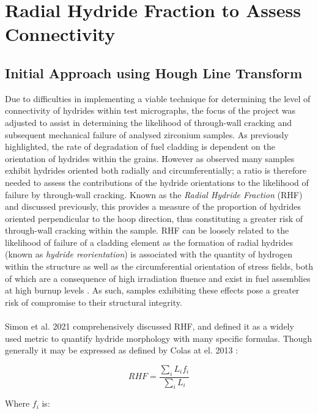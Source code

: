 \documentclass{article}
\begin{document}
\section{Radial Hydride Fraction to Assess Connectivity}
\subsection{Initial Approach using Hough Line Transform}

    Due to difficulties in implementing a viable technique for determining the level of connectivity of hydrides within test micrographs, the focus of the project was adjusted to assist in determining the likelihood of through-wall cracking and subsequent mechanical failure of analysed zirconium samples. As previously highlighted, the rate of degradation of fuel cladding is dependent on the orientation of hydrides within the grains. However as observed many samples exhibit hydrides oriented both radially and circumferentially; a ratio is therefore needed to assess the contributions of the hydride orientations to the likelihood of failure by through-wall cracking. Known as the \textit{Radial Hydride Fraction} (RHF) and discussed previously, this provides a measure of the proportion of hydrides oriented perpendicular to the hoop direction, thus constituting a greater risk of through-wall cracking within the sample. RHF can be loosely related to the likelihood of failure of a cladding element as the formation of radial hydrides (known as \textit{hydride reorientation}) is associated with the quantity of hydrogen within the structure as well as the circumferential orientation of stress fields, both of which are a consequence of high irradiation fluence and exist in fuel assemblies at high burnup levels \cite{Plyasov2020}. As such, samples exhibiting these effects pose a greater risk of compromise to their structural integrity.
    \\
    \\
    Simon et al. 2021 \cite{Simon2021} comprehensively discussed RHF, and defined it as a widely used metric to quantify hydride morphology with many specific formulas. Though generally it may be expressed as defined by Colas at el. 2013 \cite{Colas2013}:
    
    \begin{equation}
        RHF = \frac{ \sum_i{L_i f_i} }{ \sum_i{L_i} }
    \end{equation}
    \label{equ:RHF}
    
    \noindent Where $f_i$ is:
    
\end{document}
